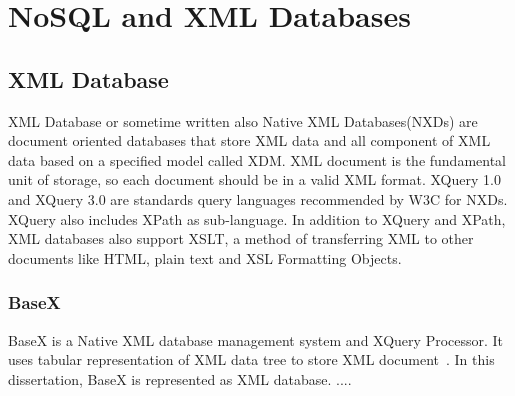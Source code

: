 \documentclass[a4paper,12pt]{article}
\begin{document}
	\label{nosql-xml-database}
	\section{NoSQL and XML Databases}
	\subsection{XML Database}
	XML Database or sometime written also Native XML Databases(NXDs) are document oriented databases that store XML data and all component of XML data based on a specified model called XDM. XML document is the fundamental unit of storage, so each document should be in a valid XML format.
	XQuery 1.0 and XQuery 3.0 are standards query languages recommended by W3C for NXDs. XQuery also includes XPath as sub-language. In addition to XQuery and XPath, XML databases also support XSLT, a method of transferring XML to other documents like HTML, plain text and XSL Formatting Objects.
	\subsubsection{BaseX}
	BaseX is a Native XML database management system and XQuery Processor. It uses tabular representation of XML data tree to store XML document~\citep{www/basex}. In this dissertation, BaseX is represented as XML database.
	....
\end{document}
